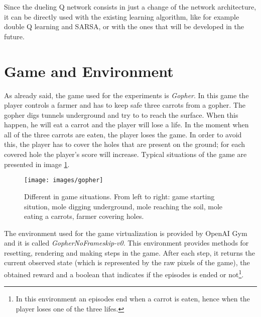 \documentclass[article,11pt]{article}
\begin{document}
	Since the dueling Q network consists in just a change of the network architecture, it can be directly used with the existing learning algorithm, like for example double Q learning and SARSA, or with the ones that will be developed in the future.
	
	\section{Game and Environment}
	As already said, the game used for the experiments is \textit{Gopher}. In this game the player controls a farmer and has to keep safe three carrots from a gopher. The gopher digs tunnels underground and try to to reach the surface. When this happen, he will eat a carrot and the player will lose a life. In the moment when all of the three carrots are eaten, the player loses the game. In order to avoid this, the player has to cover the holes that are present on the ground; for each covered hole the player's score will increase. Typical situations of the game are presented in image \ref{fig:gopher}.
	
	\begin{figure}
		\texttt{[image: images/gopher]}
		\caption{Different in game situations. From left to right: game starting sitution, mole digging underground, mole reaching the soil, mole eating a carrots, farmer covering holes.}
		\label{fig:gopher}
	\end{figure}	

	The environment used for the game virtualization is provided by OpenAI Gym and it is called \textit{GopherNoFrameskip-v0}. This environment provides methods for resetting, rendering and making steps in the game. After each step, it returns the current observed state (which is represented by the raw pixels of the game), the obtained reward and a boolean that indicates if the episodes is ended or not\footnote{In this environment an episodes end when a carrot is eaten, hence when the player loses one of the three lifes.}.
	
\end{document}

